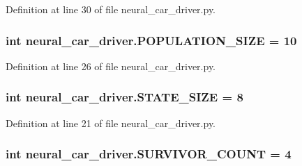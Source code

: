 Definition at line 30 of file neural\+\_\+car\+\_\+driver.\+py.

\subsubsection[{\texorpdfstring{P\+O\+P\+U\+L\+A\+T\+I\+O\+N\+\_\+\+S\+I\+ZE}{POPULATION_SIZE}}]{\setlength{\rightskip}{0pt plus 5cm}int neural\+\_\+car\+\_\+driver.\+P\+O\+P\+U\+L\+A\+T\+I\+O\+N\+\_\+\+S\+I\+ZE = 10}\hypertarget{namespaceneural__car__driver_aaf8ade0766a9fd72a41c1029d04d6d5e}{}\label{namespaceneural__car__driver_aaf8ade0766a9fd72a41c1029d04d6d5e}


Definition at line 26 of file neural\+\_\+car\+\_\+driver.\+py.

\subsubsection[{\texorpdfstring{S\+T\+A\+T\+E\+\_\+\+S\+I\+ZE}{STATE_SIZE}}]{\setlength{\rightskip}{0pt plus 5cm}int neural\+\_\+car\+\_\+driver.\+S\+T\+A\+T\+E\+\_\+\+S\+I\+ZE = 8}\hypertarget{namespaceneural__car__driver_ac9d3bc133f799be5e8c5c55884d10a8d}{}\label{namespaceneural__car__driver_ac9d3bc133f799be5e8c5c55884d10a8d}


Definition at line 21 of file neural\+\_\+car\+\_\+driver.\+py.

\subsubsection[{\texorpdfstring{S\+U\+R\+V\+I\+V\+O\+R\+\_\+\+C\+O\+U\+NT}{SURVIVOR_COUNT}}]{\setlength{\rightskip}{0pt plus 5cm}int neural\+\_\+car\+\_\+driver.\+S\+U\+R\+V\+I\+V\+O\+R\+\_\+\+C\+O\+U\+NT = 4}\hypertarget{namespaceneural__car__driver_ad40064153991947271d4a197983593fa}{}\label{namespaceneural__car__driver_ad40064153991947271d4a197983593fa}


